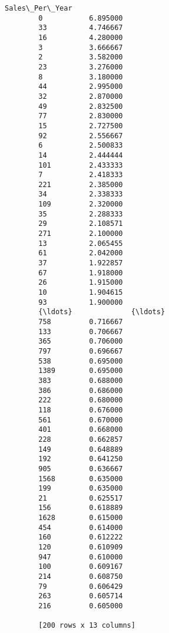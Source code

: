 \documentclass[11pt]{article}
\begin{document}
\begin{Verbatim}[commandchars=\\\{\}]
              Sales\_Per\_Year  
        0           6.895000  
        33          4.746667  
        16          4.280000  
        3           3.666667  
        2           3.582000  
        23          3.276000  
        8           3.180000  
        44          2.995000  
        32          2.870000  
        49          2.832500  
        77          2.830000  
        15          2.727500  
        92          2.556667  
        6           2.500833  
        14          2.444444  
        101         2.433333  
        7           2.418333  
        221         2.385000  
        34          2.338333  
        109         2.320000  
        35          2.288333  
        29          2.108571  
        271         2.100000  
        13          2.065455  
        61          2.042000  
        37          1.922857  
        67          1.918000  
        26          1.915000  
        10          1.904615  
        93          1.900000  
        {\ldots}              {\ldots}  
        758         0.716667  
        133         0.706667  
        365         0.706000  
        797         0.696667  
        538         0.695000  
        1389        0.695000  
        383         0.688000  
        386         0.686000  
        222         0.680000  
        118         0.676000  
        561         0.670000  
        401         0.668000  
        228         0.662857  
        149         0.648889  
        192         0.641250  
        905         0.636667  
        1568        0.635000  
        199         0.635000  
        21          0.625517  
        156         0.618889  
        1628        0.615000  
        454         0.614000  
        160         0.612222  
        120         0.610909  
        947         0.610000  
        100         0.609167  
        214         0.608750  
        79          0.606429  
        263         0.605714  
        216         0.605000  
        
        [200 rows x 13 columns]
\end{Verbatim}
            

    
    
    
    
\end{document}
